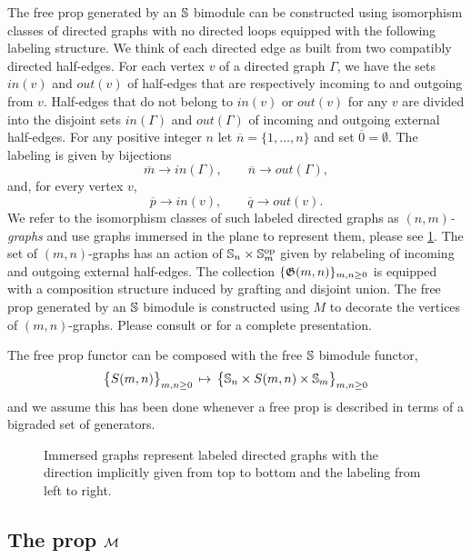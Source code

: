 The free prop generated by an $\S$ bimodule can be constructed using isomorphism classes of directed graphs with no directed loops equipped with the following labeling structure.
We think of each directed edge as built from two compatibly directed half-edges. For each vertex $v$ of a directed graph $\Gamma$, we have the sets $in(v)$ and $out(v)$ of half-edges that are respectively incoming to and outgoing from $v$. Half-edges that do not belong to $in(v)$ or $out(v)$ for any $v$ are divided into the disjoint sets $in(\Gamma)$ and $out(\Gamma)$ of incoming and outgoing external half-edges.
For any positive integer $n$ let $\overline{n} = \{1,\dots,n\}$ and set $\overline{0} = \emptyset$.
The labeling is given by bijections  
\begin{equation*}
\overline{m} \to in(\Gamma), \qquad
\overline{n} \to out(\Gamma),
\end{equation*}
and, for every vertex $v$,
\begin{equation*}
\overline{p} \to in(v), \qquad
\overline{q} \to out(v).
\end{equation*}
We refer to the isomorphism classes of such labeled directed graphs as $(n,m)$\textit{-graphs} and use graphs immersed in the plane to represent them, please see \cref{f:immersion}.
The set of $(m,n)$-graphs has an action of $\S_n \times \S_m^{\op}$ given by relabeling of incoming and outgoing external half-edges.
The collection $\{\G(m,n)\}_{m,n \geq 0}$ is equipped with a composition structure induced by grafting and disjoint union.
The free prop generated by an $\S$ bimodule is constructed using $M$ to decorate the vertices of $(m,n)$-graphs.
Please consult \cite{markl2008props} or \cite{fresse2010props} for a complete presentation.

The free prop functor can be composed with the free $\S$ bimodule functor, 
\begin{equation*}
\big\{ S(m,n) \big\}_{m,n \geq 0} \, \mapsto \, \big\{ \S_n \times S(m,n) \times \S_m \big\}_{m,n \geq 0}
\end{equation*}
and we assume this has been done whenever a free prop is described in terms of a bigraded set of generators.

\begin{figure}
	
	\caption{Immersed graphs represent labeled directed graphs with the direction implicitly given from top to bottom and the labeling from left to right.}
	\label{f:immersion}
\end{figure}

\subsection{The prop $\M$}

